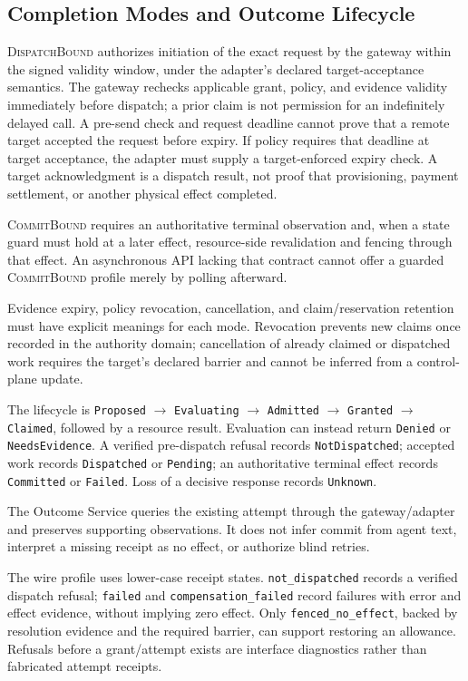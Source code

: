 \subsection{Completion Modes and Outcome Lifecycle}
\label{sec:completion-modes}
\textsc{DispatchBound} authorizes initiation of the exact request by the gateway within the signed validity window, under the adapter's declared target-acceptance semantics. The gateway rechecks applicable grant, policy, and evidence validity immediately before dispatch; a prior claim is not permission for an indefinitely delayed call. A pre-send check and request deadline cannot prove that a remote target accepted the request before expiry. If policy requires that deadline at target acceptance, the adapter must supply a target-enforced expiry check. A target acknowledgment is a dispatch result, not proof that provisioning, payment settlement, or another physical effect completed.

\textsc{CommitBound} requires an authoritative terminal observation and, when a state guard must hold at a later effect, resource-side revalidation and fencing through that effect. An asynchronous API lacking that contract cannot offer a guarded \textsc{CommitBound} profile merely by polling afterward.

Evidence expiry, policy revocation, cancellation, and claim/reservation retention must have explicit meanings for each mode. Revocation prevents new claims once recorded in the authority domain; cancellation of already claimed or dispatched work requires the target's declared barrier and cannot be inferred from a control-plane update.

The lifecycle is \texttt{Proposed} $\rightarrow$ \texttt{Evaluating} $\rightarrow$ \texttt{Admitted} $\rightarrow$ \texttt{Granted} $\rightarrow$ \texttt{Claimed}, followed by a resource result. Evaluation can instead return \texttt{Denied} or \texttt{NeedsEvidence}. A verified pre-dispatch refusal records \texttt{NotDispatched}; accepted work records \texttt{Dispatched} or \texttt{Pending}; an authoritative terminal effect records \texttt{Committed} or \texttt{Failed}. Loss of a decisive response records \texttt{Unknown}.

The Outcome Service queries the existing attempt through the gateway/adapter and preserves supporting observations. It does not infer commit from agent text, interpret a missing receipt as no effect, or authorize blind retries.

The wire profile uses lower-case receipt states. \texttt{not\_dispatched} records a verified dispatch refusal; \texttt{failed} and \texttt{compensation\_failed} record failures with error and effect evidence, without implying zero effect. Only \texttt{fenced\_no\_effect}, backed by resolution evidence and the required barrier, can support restoring an allowance. Refusals before a grant/attempt exists are interface diagnostics rather than fabricated attempt receipts.

